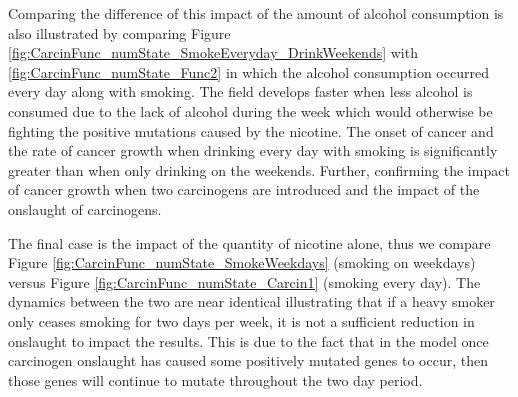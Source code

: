 \documentclass[\main/thesis.tex]{subfiles}
\begin{document}
Comparing the difference of this impact of the amount of alcohol consumption is also illustrated by comparing Figure \ref{fig:CarcinFunc_numState_SmokeEveryday_DrinkWeekends} with \ref{fig:CarcinFunc_numState_Func2} in which the alcohol consumption occurred every day along with smoking. The field develops faster when less alcohol is consumed due to the lack of alcohol during the week which would otherwise be fighting the positive mutations caused by the nicotine. The onset of cancer and the rate of cancer growth when drinking every day with smoking is significantly greater than when only drinking on the weekends. Further, confirming the impact of cancer growth when two carcinogens are introduced and the impact of the onslaught of carcinogens.

The final case is the impact of the quantity of nicotine alone, thus we compare Figure \ref{fig:CarcinFunc_numState_SmokeWeekdays} (smoking on weekdays) versus Figure \ref{fig:CarcinFunc_numState_Carcin1} (smoking every day). The dynamics between the two are near identical illustrating that if a heavy smoker only ceases smoking for two days per week, it is not a sufficient reduction in onslaught to impact the results. This is due to the fact that in the model once carcinogen onslaught has caused some positively mutated genes to occur, then those genes will continue to mutate throughout the two day period.  
\end{document}
